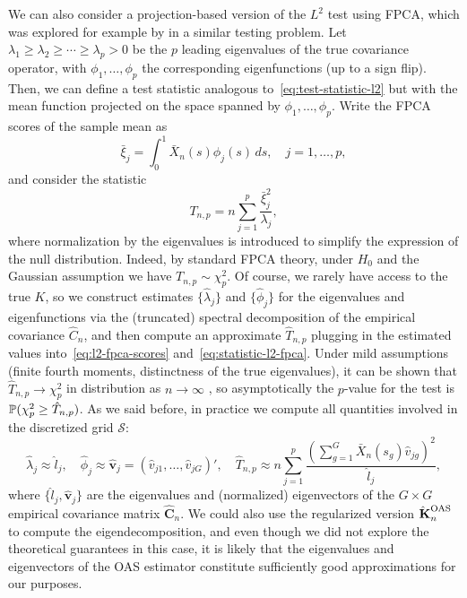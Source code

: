 We can also consider a projection-based version of the \(L^2\) test using \acs{FPCA}, which was explored for example by \citet{horvath2012inference} in a similar testing problem. Let \(\lambda_1\geq \lambda_2\geq \cdots \geq \lambda_p>0\) be the \(p\) leading eigenvalues of the true covariance operator, with \(\phi_1,\dots,\phi_p\) the corresponding eigenfunctions (up to a sign flip). Then, we can define a test statistic analogous to~\eqref{eq:test-statistic-l2} but with the mean function projected on the space spanned by \(\phi_1,\dots,\phi_p\). Write the \acs{FPCA} scores of the sample mean as
\begin{equation}\label{eq:l2-fpca-scores}
\bar{\xi}_j = \int_0^1 \bar X_n(s)\phi_j(s)\, ds,\quad j=1,\dots,p,
\end{equation}
and consider the statistic
\begin{equation}\label{eq:statistic-l2-fpca}
T_{n,p} = n \sum_{j=1}^p \frac{\bar{\xi}_j^2}{\lambda_j},
\end{equation}
where normalization by the eigenvalues is introduced to simplify the expression of the null distribution. Indeed, by standard \acs{FPCA} theory, under \(H_0\) and the Gaussian assumption we have \(T_{n,p}\sim \chi^2_p\). Of course, we rarely have access to the true \(K\), so we construct estimates \(\{\hat\lambda_j\}\) and \(\{\hat\phi_j\}\) for the eigenvalues and eigenfunctions via the (truncated) spectral decomposition of the empirical covariance \(\hat C_n\), and then compute an approximate \(\hat T_{n,p}\) plugging in the estimated values into~\eqref{eq:l2-fpca-scores} and~\eqref{eq:statistic-l2-fpca}. Under mild assumptions (finite fourth moments, distinctness of the true eigenvalues), it can be shown that \(\hat T_{n,p}\to\chi^2_p\) in distribution as \(n\to\infty\) \citep[Theorem~5.3]{horvath2012inference}, so asymptotically the \(p\)-value for the test is \(\mathbb{P}(\chi^2_p \geq \hat T_{n,p})\). As we said before, in practice we compute all quantities involved in the discretized grid \(\mathcal S\):
\[
\hat \lambda_j \approx \hat l_j,\quad \hat\phi_j \approx \hat{\mathbf v}_j=(\hat v_{j1},\dots, \hat v_{jG})', \quad \hat T_{n,p} \approx n\sum_{j=1}^p \frac{\left(\sum_{g=1}^G \bar{X}_n(s_g)\hat v_{jg}\right)^2}{\hat l_j}, 
\]
where \(\{\hat l_j, \hat{\mathbf v}_j\}\) are the eigenvalues and (normalized) eigenvectors of the \(G\times G\) empirical covariance matrix \(\hat{\mathbf C}_n\). We could also use the regularized version \(\hatbfKnOAS\) to compute the eigendecomposition, and even though we did not explore the theoretical guarantees in this case, it is likely that the eigenvalues and eigenvectors of the \acs{OAS} estimator constitute sufficiently good approximations for our purposes.

